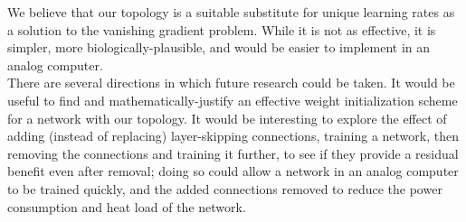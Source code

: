 \documentclass{article}
\newcommand{\npar}{\\\indent}
\begin{document}
We believe that our topology is a suitable substitute for unique learning rates as a solution to the vanishing gradient problem. While it is not as effective, it is simpler, more biologically-plausible, and would be easier to implement in an analog computer.
\npar
There are several directions in which future research could be taken. It would be useful to find and mathematically-justify an effective weight initialization scheme for a network with our topology. It would be interesting to explore the effect of adding (instead of replacing) layer-skipping connections, training a network, then removing the connections and training it further, to see if they provide a residual benefit even after removal; doing so could allow a network in an analog computer to be trained quickly, and the added connections removed to reduce the power consumption and heat load of the network. 



\nocite{*}

\end{document}
